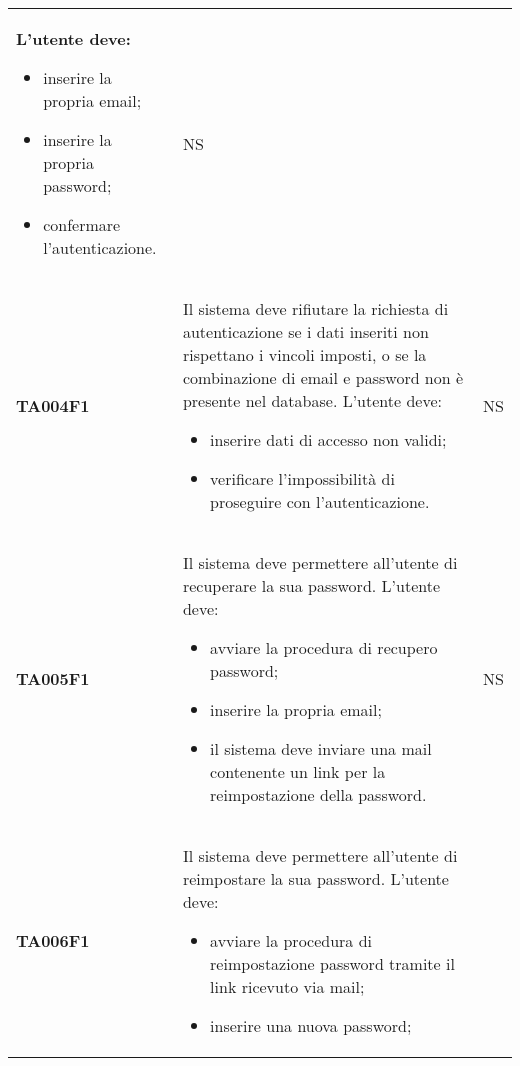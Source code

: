 \documentclass[../piano-di-qualifica.tex]{subfiles}
\begin{document}
\begin{centering}
\begin{longtable}[H]{>{\centering\bfseries}m{3cm} >{}p{10cm} >{\centering\arraybackslash}m{3cm}}
                        L'utente deve:
                        \begin{itemize}
                          \item inserire la propria email;
                          \item inserire la propria password;
                          \item confermare l'autenticazione.
                        \end{itemize}
                      & NS \\
        TA004F1      & Il sistema deve rifiutare la richiesta di autenticazione se i dati inseriti non rispettano i vincoli imposti, o se la combinazione di email e password non è presente nel database. \newline
                        L'utente deve:
                        \begin{itemize}
                          \item inserire dati di accesso non validi;
                          \item verificare l'impossibilità di proseguire con l'autenticazione.
                        \end{itemize}
                      & NS \\
        TA005F1      & Il sistema deve permettere all'utente di recuperare la sua password. \newline
                        L'utente deve:
                        \begin{itemize}
                          \item avviare la procedura di recupero password;
                          \item inserire la propria email;
                          \item il sistema deve inviare una mail contenente un link per la reimpostazione della password.
                        \end{itemize}
                      & NS \\
        TA006F1      & Il sistema deve permettere all'utente di reimpostare la sua password. \newline
                        L'utente deve:
                        \begin{itemize}
                          \item avviare la procedura di reimpostazione password tramite il link ricevuto via mail;
                          \item inserire una nuova password;

\end{itemize}
\end{longtable}
\end{centering}
\end{document}
